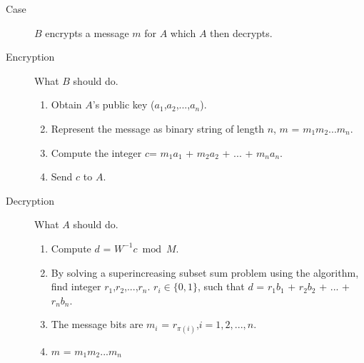 \documentclass{acm_proc_article-sp}
\begin{document}
    \begin{description}
    \item[Case] $B$ encrypts a message $m$ for $A$ which $A$ then decrypts.
    \item[Encryption] What $B$ should do.
    \begin{enumerate}
        \item Obtain $A$'s public key ($a_1$,$a_2$,...,$a_n$).
        \item Represent the message as binary string of length $n$, $m$ = $m_1m_2...m_n$.
        \item Compute the integer $c$= $m_1a_1$ + $m_2a_2$ + ... + $m_na_n$.
        \item Send $c$ to $A$.
    \end{enumerate}
    \item[Decryption] What $A$ should do.
    \begin{enumerate}
        \item Compute $d$ = $W^{-1}c \bmod M$.
        \item By solving a superincreasing subset sum problem using the algorithm, find integer $r_1$,$r_2$,...,$r_n$. $r_i \in \{0,1\}$, such that $d$ = $r_1b_1$ + $r_2b_2$ + ... + $r_nb_n$.
        \item The message bits are $m_i$ = $r_{\pi(i)}$,$i = 1,2,...,n$.
        \item $m$ = $m_1m_2...m_n$
    \end{enumerate}
    \end{description}
    
    
    
\end{document}
